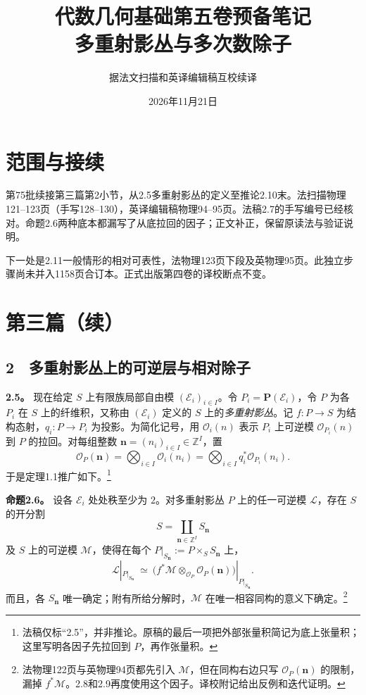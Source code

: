 \documentclass[openany,fontset=fandol]{ctexbook}
\newcommand{\OO}{\mathcal O}
\newcommand{\LL}{\mathcal L}
\newcommand{\MM}{\mathcal M}
\newcommand{\EE}{\mathcal E}
\newcommand{\nn}{\boldsymbol n}
\begin{document}
\title{代数几何基础第五卷预备笔记\\多重射影丛与多次数除子}
\author{据法文扫描和英译编辑稿互校续译}
\date{2026年11月21日}
\maketitle
\chapter*{范围与接续}
第75批续接第三篇第2小节，从2.5多重射影丛的定义至推论2.10末。法扫描物理121--123页（手写128--130），英译编辑稿物理94--95页。法稿2.7的手写编号已经核对。命题2.6两种底本都漏写了从底拉回的因子；正文补正，保留原读法与验证说明。

下一处是2.11一般情形的相对可表性，法物理123页下段及英物理95页。此独立步骤尚未并入1158页合订本。正式出版第四卷的译校断点不变。
\chapter*{第三篇（续）}
\section*{2　多重射影丛上的可逆层与相对除子}
\noindent\textbf{2.5。}
现在给定 \(S\) 上有限族局部自由模 \((\EE_i)_{i\in I}\)。令 \(P_i=\mathbf P(\EE_i)\)，令 \(P\) 为各 \(P_i\) 在 \(S\) 上的纤维积，又称由 \((\EE_i)\) 定义的 \(S\) 上的\emph{多重射影丛}。记 \(f:P\to S\) 为结构态射，\(q_i:P\to P_i\) 为投影。为简化记号，用 \(\OO_i(n)\) 表示 \(P_i\) 上可逆模 \(\OO_{P_i}(n)\) 到 \(P\) 的拉回。对每组整数 \(\nn=(n_i)_{i\in I}\in\mathbb Z^I\)，置
\[
 \OO_P(\nn)
 =\bigotimes_{i\in I}\OO_i(n_i)
 =\bigotimes_{i\in I}q_i^*\OO_{P_i}(n_i).
\]
于是定理1.1推广如下。\footnote{法稿仅标“2.5”，并非推论。原稿的最后一项把外部张量积简记为底上张量积；这里写明各因子先拉回到 \(P\)，再作张量积。}

\medskip\noindent\textbf{命题2.6。}
设各 \(\EE_i\) 处处秩至少为 \(2\)。对多重射影丛 \(P\) 上的任一可逆模 \(\LL\)，存在 \(S\) 的开分割
\[
 S=\coprod_{\nn\in\mathbb Z^I}S_{\nn}
\]
及 \(S\) 上的可逆模 \(\MM\)，使得在每个 \(P|_{S_{\nn}}:=P\times_S S_{\nn}\) 上，
\[
 \LL|_{P|_{S_{\nn}}}
 \ \simeq\ 
 \bigl(f^*\MM\otimes_{\OO_P}\OO_P(\nn)\bigr)|_{P|_{S_{\nn}}}.
\]
而且，各 \(S_{\nn}\) 唯一确定；附有所给分解时，\(\MM\) 在唯一相容同构的意义下确定。\footnote{法物理122页与英物理94页都先引入 \(\MM\)，但在同构右边只写 \(\OO_P(\nn)\) 的限制，漏掉 \(f^*\MM\)。2.8和2.9再度使用这个因子。译校附记给出反例和迭代证明。}
\end{document}

